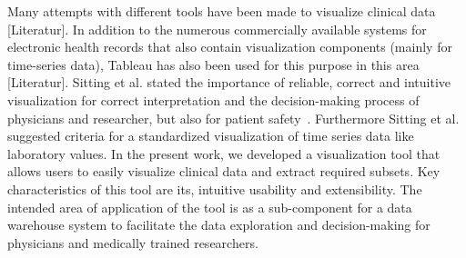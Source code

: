 \documentclass[aac,crcready]{iosart2x}
\begin{document}
Many attempts with different tools have been made to visualize clinical data [Literatur]. In addition to the numerous commercially available systems for electronic health records that also contain visualization components (mainly for time-series data), Tableau has also been used for this purpose in this area [Literatur]. Sitting et al. stated the importance of reliable, correct and intuitive visualization for correct interpretation and the decision-making process of physicians and researcher, but also for patient safety~\cite{Sittig.2015}. 
Furthermore Sitting et al. suggested criteria for a standardized visualization of time series data like laboratory values. In the present work, we developed a visualization tool that allows users to easily visualize clinical data and extract required subsets. Key characteristics of this tool are its, intuitive usability and extensibility. The intended area of application of the tool is as a sub-component for a data warehouse system to facilitate the data exploration and decision-making for physicians and medically trained researchers.







\end{document}
